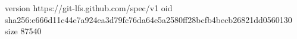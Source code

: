 version https://git-lfs.github.com/spec/v1
oid sha256:e666d11c44e7a924ea3d79fc76da64e5a2580ff28bcfb4becb26821dd0560130
size 87540
